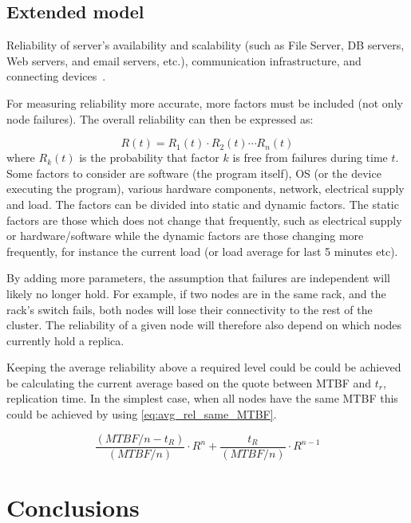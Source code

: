 \documentclass{cslthse-msc}
\begin{document}
\section{Extended model} \label{subsec:future_extended_model}
Reliability of server’s availability and scalability (such as File Server, DB servers, Web servers, and email servers, etc.), communication infrastructure, and connecting devices~\cite{surveyReliabilityDistr}.

For measuring reliability more accurate, more factors must be included (not only node failures). The overall reliability can then be expressed as:

\begin{equation} \label{eq:overall_reliability}
R(t) = R_{1}(t) \cdot R_{2}(t) \cdots R_{n}(t)
\end{equation}
where $R_{k}(t)$ is the probability that factor $k$ is free from failures during time $t$. Some factors to consider are software (the program itself), OS (or the device executing the program), various hardware components, network, electrical supply and load. The factors can be divided into static and dynamic factors. The static factors are those which does not change that frequently, such as electrical supply or hardware/software while the dynamic factors are those changing more frequently, for instance the current load (or load average for last 5 minutes etc). 

By adding more parameters, the assumption that failures are independent will likely no longer hold. For example, if two nodes are in the same rack, and the rack's switch fails, both nodes will lose their connectivity to the rest of the cluster. The reliability of a given node will therefore also depend on which nodes currently hold a replica.

Keeping the average reliability above a required level could be could be achieved be calculating the current average based on the quote between MTBF and $t_r$, replication time.
In the simplest case, when all nodes have the same MTBF this could be achieved by using \cref{eq:avg_rel_same_MTBF}.

\begin{equation} \label{eq:avg_rel_same_MTBF}
	\frac{(MTBF/n - t_{R})}{(MTBF/n)} \cdot R^n + \frac{t_{R}}{(MTBF/n)} \cdot R^{n-1}
\end{equation}

\chapter{Conclusions} \label{ch:conclusions}
\end{document}
